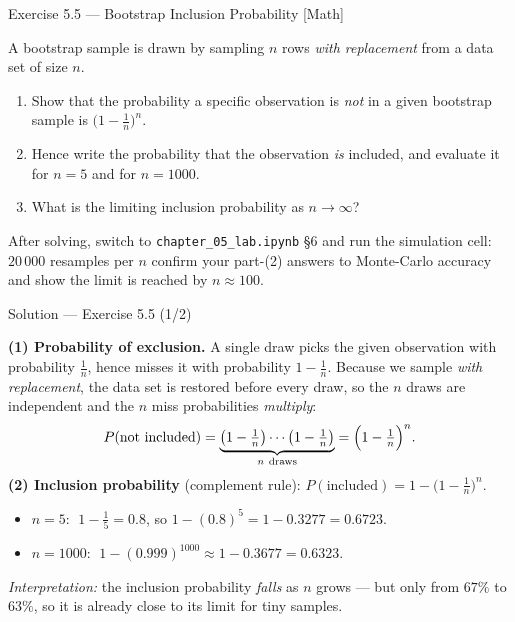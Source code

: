 \documentclass[aspectratio=169,11pt]{beamer}
\begin{document}
\begin{frame}{Exercise 5.5 --- Bootstrap Inclusion Probability [Math]}
  \begin{exercise}
    A bootstrap sample is drawn by sampling $n$ rows \emph{with
    replacement} from a data set of size $n$.
    \begin{enumerate}
      \item Show that the probability a specific observation is
            \emph{not} in a given bootstrap sample is
            $\bigl(1 - \tfrac1n\bigr)^n$.
      \item Hence write the probability that the observation \emph{is}
            included, and evaluate it for $n = 5$ and for $n = 1000$.
      \item What is the limiting inclusion probability as
            $n \to \infty$?
    \end{enumerate}
  \end{exercise}
  \begin{labnote}
    After solving, switch to \texttt{chapter\_05\_lab.ipynb} \S6 and run the
    simulation cell: $20\,000$ resamples per $n$ confirm your part-(2) answers
    to Monte-Carlo accuracy and show the limit is reached by $n \approx 100$.
  \end{labnote}
\end{frame}

\begin{frame}{Solution --- Exercise 5.5 (1/2)}
  \begin{solutionbox}
    \textbf{(1) Probability of exclusion.}
    A single draw picks the given observation with probability
    $\tfrac1n$, hence misses it with probability $1 - \tfrac1n$.
    Because we sample \emph{with replacement}, the data set is restored
    before every draw, so the $n$ draws are independent and the $n$
    miss probabilities \emph{multiply}:
    \[
      P(\text{not included})
      = \underbrace{\bigl(1-\tfrac1n\bigr)\cdots\bigl(1-\tfrac1n\bigr)}_{n\ \text{draws}}
      = \Bigl(1 - \tfrac1n\Bigr)^n .
    \]
    \textbf{(2) Inclusion probability} (complement rule):
    $P(\text{included}) = 1 - \bigl(1 - \tfrac1n\bigr)^n$.
    \begin{itemize}
      \item $n = 5$: $\;1 - \tfrac15 = 0.8$, so
            $1 - (0.8)^5 = 1 - 0.3277 = 0.6723$.
      \item $n = 1000$: $\;1 - (0.999)^{1000} \approx 1 - 0.3677
            = 0.6323$.
    \end{itemize}
    \emph{Interpretation:} the inclusion probability \emph{falls} as $n$
    grows --- but only from $67\%$ to $63\%$, so it is already close to
    its limit for tiny samples.
  \end{solutionbox}
\end{frame}
\end{document}
